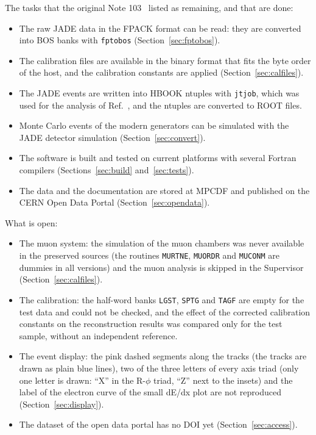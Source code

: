 The tasks that the original Note 103~\cite{JCN:103} listed as remaining, and that are done:
\begin{itemize}
\item The raw JADE data in the FPACK format can be read: they are converted into BOS banks with \texttt{fptobos} (Section~\ref{sec:fptobos}).
\item The calibration files are available in the binary format that fits the byte order of the host, and the calibration constants are applied
(Section~\ref{sec:calfiles}).
\item The JADE events are written into HBOOK ntuples with \texttt{jtjob}, which was used for the analysis of Ref.~\cite{Verbytskyi:2019zhh}, and the
ntuples are converted to ROOT files.
\item Monte Carlo events of the modern generators can be simulated with the JADE detector simulation (Section~\ref{sec:convert}).
\item The software is built and tested on current platforms with several Fortran compilers (Sections~\ref{sec:build} and~\ref{sec:tests}).
\item The data and the documentation are stored at MPCDF and published on the CERN Open Data Portal (Section~\ref{sec:opendata}).
\end{itemize}

What is open:
\begin{itemize}
\item The muon system: the simulation of the muon chambers was never available in the preserved sources (the routines \texttt{MURTNE}, \texttt{MUORDR} and \texttt{MUCONM} are dummies in all versions) and the muon analysis is
skipped in the Supervisor (Section~\ref{sec:calfiles}).
\item The calibration: the half-word banks \texttt{LGST}, \texttt{SPTG} and \texttt{TAGF} are empty for the test data and could not be checked, and the
effect of the corrected calibration constants on the reconstruction results was compared only for the test sample, without an independent reference.
\item The event display: the pink dashed segments along the tracks (the tracks are drawn as plain blue lines), two of the three letters of every axis triad (only one
letter is drawn: ``X'' in the R-$\phi$ triad, ``Z'' next to the insets) and the label of the electron curve of the small dE/dx plot are not reproduced
(Section~\ref{sec:display}).
\item The dataset of the open data portal has no DOI yet (Section~\ref{sec:access}).
\end{itemize}

